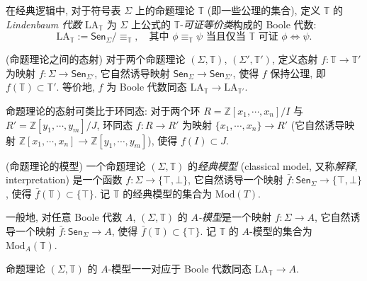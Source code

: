\begin{definition}
	{}
	在经典逻辑中, 对于符号表 $\Sigma$ 上的命题理论 $\mathbb T$ (即一些公理的集合), 定义 $\mathbb T$ 的 \emph{Lindenbaum 代数} $\text{LA}_{\mathbb T}$ 为 $\Sigma$ 上公式的 $\mathbb T$-\emph{可证等价类}构成的 Boole 代数:
	$$
	\text{LA}_{\mathbb T} := \mathsf {Sen}_\Sigma \big/ {\equiv_{\mathbb T}},\quad
	\text{其中 $\phi\equiv_{\mathbb T} \psi$ 当且仅当 $\mathbb T$ 可证 $\phi\Leftrightarrow\psi$}.
	$$
\end{definition}

\begin{definition}
	{(命题理论之间的态射)}
	对于两个命题理论 $(\Sigma,\mathbb T)$, $(\Sigma',\mathbb T')$, 定义态射 $f\colon \mathbb T \to \mathbb T'$ 为映射 $f\colon \Sigma \to \mathsf {Sen}_{\Sigma'}$, 它自然诱导映射 $\mathsf {Sen}_\Sigma\to \mathsf {Sen}_{\Sigma'}$, 使得 $f$ 保持公理, 即 $f(\mathbb T)\subset \mathbb T'$. 等价地, $f$ 为 Boole 代数同态 $\text{LA}_{\mathbb T} \to \text{LA}_{\mathbb T'}$.
\end{definition}

\begin{remark}
	{}
	命题理论的态射可类比于环同态: 对于两个环 $R=\mathbb{Z}[x_1,\cdots,x_n]/I$ 与 $R'=\mathbb{Z}[y_1,\cdots,y_m]/J$, 环同态 $f\colon R\to R'$ 为映射 $\{x_1,\cdots,x_n\}\to R'$ (它自然诱导映射 $\mathbb{Z}[x_1,\cdots,x_n]\to \mathbb{Z}[y_1,\cdots,y_m]$), 使得 $f(I)\subset J$.
\end{remark}

\begin{definition}
	{(命题理论的模型)}
	一个命题理论 $(\Sigma,\mathbb T)$ 的\emph{经典模型} (classical model, 又称\emph{解释}, interpretation) 是一个函数 $f\colon \Sigma \to \{\top,\bot\}$, 它自然诱导一个映射 $\bar f\colon \mathsf {Sen}_\Sigma\to\{\top,\bot\}$, 使得 $\bar f(\mathbb T)\subset \{\top\}$. 记 $\mathbb T$ 的经典模型的集合为 $\text{Mod}(T)$.
	
	一般地, 对任意 Boole 代数 $A$, $(\Sigma,\mathbb T)$ 的 \emph{$A$-模型}是一个映射 $f\colon \Sigma \to A$, 它自然诱导一个映射 $\bar f\colon \mathsf {Sen}_\Sigma\to A$, 使得 $\bar f(\mathbb T)\subset \{\top\}$. 记 $\mathbb T$ 的 $A$-模型的集合为 $\text{Mod}_A(\mathbb T)$.
\end{definition}



\begin{prop}
	{}
	命题理论 $(\Sigma,\mathbb T)$ 的 $A$-模型一一对应于 Boole 代数同态 $\text{LA}_{\mathbb T} \to A$.
\end{prop}

